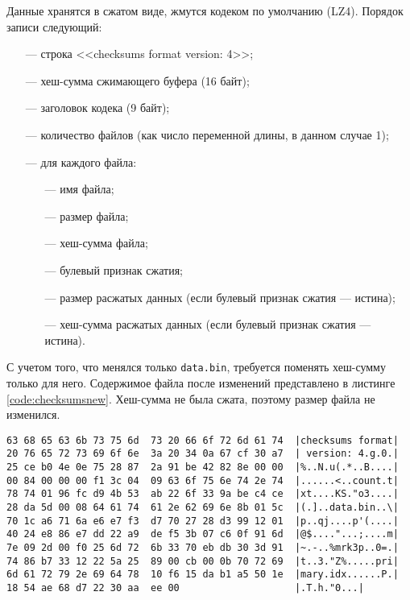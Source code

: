Данные хранятся в сжатом виде, жмутся кодеком по умолчанию (LZ4). Порядок записи следующий:
\begin{itemize}
    \item [---] строка <<checksums format version: 4>>;
    \item [---] хеш-сумма сжимающего буфера (16 байт);
    \item [---] заголовок кодека (9 байт);
    \item [---] количество файлов (как число переменной длины, в данном случае 1);
    \item [---] для каждого файла:
        \begin{itemize}
            \item [---] имя файла;
            \item [---] размер файла;
            \item [---] хеш-сумма файла;
            \item [---] булевый признак сжатия;
            \item [---] размер расжатых данных (если булевый признак сжатия --- истина);
            \item [---] хеш-сумма расжатых данных (если булевый признак сжатия --- истина).
        \end{itemize}
\end{itemize}

С учетом того, что менялся только \texttt{data.bin}, требуется поменять хеш-сумму только для него. Содержимое файла после изменений представлено в листинге \ref{code:checksumsnew}. Хеш-сумма не была сжата, поэтому размер файла не изменился.

\begin{lstlisting}[label=code:checksumsnew, caption={Хеш-суммы, описанные в файле \texttt{checksums.txt} после внесения изменений.}]
63 68 65 63 6b 73 75 6d  73 20 66 6f 72 6d 61 74  |checksums format|
20 76 65 72 73 69 6f 6e  3a 20 34 0a 67 cf 30 a7  | version: 4.g.0.|
25 ce b0 4e 0e 75 28 87  2a 91 be 42 82 8e 00 00  |%..N.u(.*..B....|
00 84 00 00 00 f1 3c 04  09 63 6f 75 6e 74 2e 74  |......<..count.t|
78 74 01 96 fc d9 4b 53  ab 22 6f 33 9a be c4 ce  |xt....KS."o3....|
28 da 5d 00 08 64 61 74  61 2e 62 69 6e 8b 01 5c  |(.]..data.bin..\|
70 1c a6 71 6a e6 e7 f3  d7 70 27 28 d3 99 12 01  |p..qj....p'(....|
40 24 e8 86 e7 dd 22 a9  de f5 3b 07 c6 0f 91 6d  |@$...."...;....m|
7e 09 2d 00 f0 25 6d 72  6b 33 70 eb db 30 3d 91  |~.-..%mrk3p..0=.|
74 86 b7 33 12 22 5a 25  89 00 cb 00 0b 70 72 69  |t..3."Z%.....pri|
6d 61 72 79 2e 69 64 78  10 f6 15 da b1 a5 50 1e  |mary.idx......P.|
18 54 ae 68 d7 22 30 aa  ee 00                    |.T.h."0...|
\end{lstlisting}

